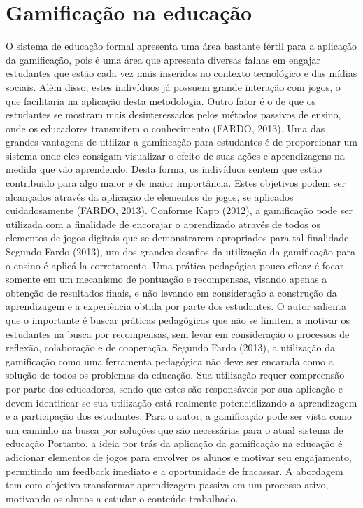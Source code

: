 \documentclass[
	12pt,				%
	oneside,			%
	a4paper,			%
	english,			%
	french,				%
	spanish,			%
	brazil,				%
	]{abntex2}
\begin{document}
\section{Gamificação na educação}

	O sistema de educação formal apresenta uma área bastante fértil para a aplicação da gamificação, pois é uma área que apresenta diversas falhas em engajar estudantes que estão cada vez mais inseridos no contexto tecnológico e das mídias sociais. Além disso, estes indivíduos já possuem grande interação com jogos, o que facilitaria na aplicação desta metodologia. Outro fator é o de que os estudantes se mostram mais desinteressados pelos métodos passivos de ensino, onde os educadores transmitem o conhecimento (FARDO, 2013). 
Uma das grandes vantagens de utilizar a gamificação para estudantes é de proporcionar um sistema onde eles consigam visualizar o efeito de suas ações e aprendizagens na medida que vão aprendendo. Desta forma, os indivíduos sentem que estão contribuido para algo maior e de maior importância. Estes objetivos podem ser alcançados através da aplicação de elementos de jogos, se aplicados cuidadosamente (FARDO, 2013). Conforme Kapp (2012), a gamificação pode ser utilizada com a finalidade de encorajar o aprendizado através de todos os elementos de jogos digitais que se demonstrarem apropriados para tal finalidade.  
	Segundo Fardo (2013), um dos grandes desafios da utilização da gamificação para o ensino é aplicá-la corretamente. Uma prática pedagógica pouco eficaz é focar somente em um mecanismo de pontuação e recompensas, visando apenas a obtenção de resultados finais, e não levando em consideração a construção da aprendizagem e a experiência obtida por parte dos estudantes. O autor salienta que o importante é buscar práticas pedagógicas que não se limitem a motivar os estudantes na busca por recompensas, sem levar em consideração o processos de reflexão, colaboração e de cooperação.
	Segundo Fardo (2013), a utilização da gamificação como uma ferramenta pedagógica não deve ser encarada como a solução de todos os problemas da educação. Sua utilização requer compreensão por parte dos educadores, sendo que estes são responsáveis por sua aplicação e devem identificar se sua utilização está realmente potencializando a aprendizagem e a participação dos estudantes. Para o autor, a gamificação pode ser vista como um caminho na busca por soluções que são necessárias para o atual sistema de educação
Portanto, a ideia por trás da aplicação da gamificação na educação é adicionar elementos de jogos para envolver os alunos e motivar seu engajamento, permitindo um feedback imediato e a oportunidade de fracassar. A abordagem tem com objetivo transformar aprendizagem passiva em um processo ativo, motivando os alunos a estudar o conteúdo trabalhado.
\end{document}
